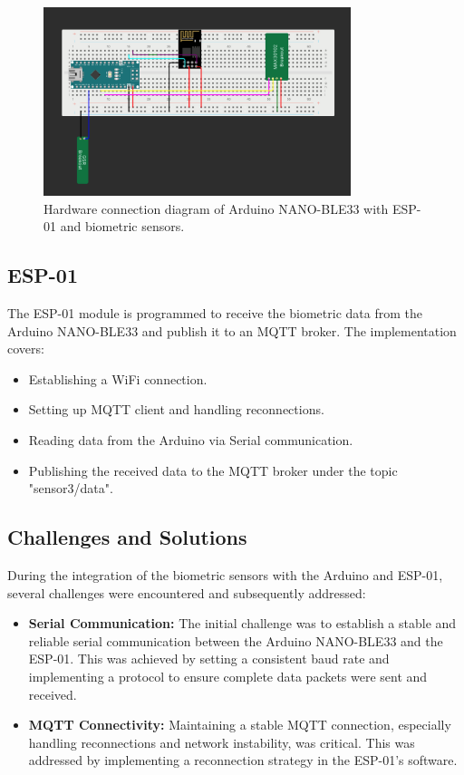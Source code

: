 \documentclass{article}
\begin{document}
\begin{figure}[h]
    \centering
    \includegraphics[width=0.8\textwidth]{../images/gsr&heart.png}
    \caption{Hardware connection diagram of Arduino NANO-BLE33 with ESP-01 and biometric sensors.}
    \label{fig:hardware-setup}
\end{figure}


\subsection{ESP-01}
The ESP-01 module is programmed to receive the biometric data from the Arduino NANO-BLE33 and publish it to an MQTT broker. The implementation covers:
\begin{itemize}
    \item Establishing a WiFi connection.
    \item Setting up MQTT client and handling reconnections.
    \item Reading data from the Arduino via Serial communication.
    \item Publishing the received data to the MQTT broker under the topic "sensor3/data".
\end{itemize}

\subsection{Challenges and Solutions}
During the integration of the biometric sensors with the Arduino and ESP-01, several challenges were encountered and subsequently addressed:
\begin{itemize}
\item \textbf{Serial Communication:} The initial challenge was to establish a stable and reliable serial communication between the Arduino NANO-BLE33 and the ESP-01. This was achieved by setting a consistent baud rate and implementing a protocol to ensure complete data packets were sent and received.
\item \textbf{MQTT Connectivity:} Maintaining a stable MQTT connection, especially handling reconnections and network instability, was critical. This was addressed by implementing a reconnection strategy in the ESP-01’s software.
\end{itemize}
\end{document}

